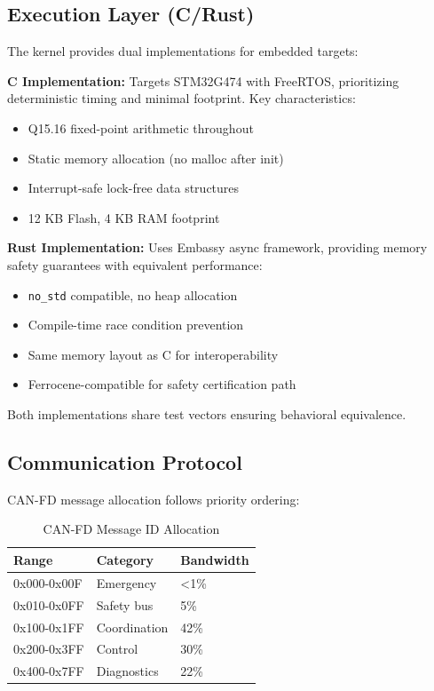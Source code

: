 \subsection{Execution Layer (C/Rust)}

The \ekkor{} kernel provides dual implementations for embedded targets:

\textbf{C Implementation:} Targets STM32G474 with FreeRTOS, prioritizing deterministic timing and minimal footprint. Key characteristics:
\begin{itemize}
    \item Q15.16 fixed-point arithmetic throughout
    \item Static memory allocation (no malloc after init)
    \item Interrupt-safe lock-free data structures
    \item 12 KB Flash, 4 KB RAM footprint
\end{itemize}

\textbf{Rust Implementation:} Uses Embassy async framework, providing memory safety guarantees with equivalent performance:
\begin{itemize}
    \item \texttt{no\_std} compatible, no heap allocation
    \item Compile-time race condition prevention
    \item Same memory layout as C for interoperability
    \item Ferrocene-compatible for safety certification path
\end{itemize}

Both implementations share test vectors ensuring behavioral equivalence.

\subsection{Communication Protocol}

CAN-FD message allocation follows priority ordering:

\begin{table}[htbp]
\centering
\caption{CAN-FD Message ID Allocation}
\label{tab:can}
\begin{tabular}{@{}lll@{}}
\toprule
Range & Category & Bandwidth \\
\midrule
0x000-0x00F & Emergency & <1\% \\
0x010-0x0FF & Safety bus & 5\% \\
0x100-0x1FF & Coordination & 42\% \\
0x200-0x3FF & Control & 30\% \\
0x400-0x7FF & Diagnostics & 22\% \\
\bottomrule
\end{tabular}
\end{table}

